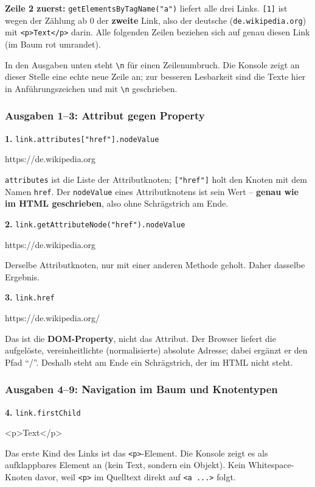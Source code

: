 \documentclass[a4paper,11pt]{article}
\begin{document}
\textbf{Zeile 2 zuerst:} \lstinline|getElementsByTagName("a")| liefert alle drei Links. \lstinline|[1]| ist wegen der
Zählung ab 0 der \textbf{zweite} Link, also der deutsche (\texttt{de.wikipedia.org}) mit \texttt{<p>Text</p>}
darin. Alle folgenden Zeilen beziehen sich auf genau diesen Link (im Baum rot umrandet).

In den Ausgaben unten steht \texttt{\textbackslash n} für einen Zeilenumbruch. Die Konsole zeigt an dieser Stelle
eine echte neue Zeile an; zur besseren Lesbarkeit sind die Texte hier in Anführungszeichen und mit
\texttt{\textbackslash n} geschrieben.

\subsubsection*{Ausgaben 1--3: Attribut gegen Property}

\textbf{1.} \lstinline|link.attributes["href"].nodeValue|
\begin{ausgabe}
https://de.wikipedia.org
\end{ausgabe}
\lstinline|attributes| ist die Liste der Attributknoten; \lstinline|["href"]| holt den Knoten mit dem Namen
\texttt{href}. Der \texttt{nodeValue} eines Attributknotens ist sein Wert -- \textbf{genau wie im HTML geschrieben},
also ohne Schrägstrich am Ende.

\textbf{2.} \lstinline|link.getAttributeNode("href").nodeValue|
\begin{ausgabe}
https://de.wikipedia.org
\end{ausgabe}
Derselbe Attributknoten, nur mit einer anderen Methode geholt. Daher dasselbe Ergebnis.

\textbf{3.} \lstinline|link.href|
\begin{ausgabe}
https://de.wikipedia.org/
\end{ausgabe}
Das ist die \textbf{DOM-Property}, nicht das Attribut. Der Browser liefert die aufgelöste, vereinheitlichte (normalisierte)
absolute Adresse; dabei ergänzt er den Pfad "`/"'. Deshalb steht am Ende ein Schrägstrich, der im HTML nicht steht.

\subsubsection*{Ausgaben 4--9: Navigation im Baum und Knotentypen}

\textbf{4.} \lstinline|link.firstChild|
\begin{ausgabe}
<p>Text</p>
\end{ausgabe}
Das erste Kind des Links ist das \texttt{<p>}-Element. Die Konsole zeigt es als aufklappbares Element an (kein Text,
sondern ein Objekt). Kein Whitespace-Knoten davor, weil \texttt{<p>} im Quelltext direkt auf \texttt{<a ...>} folgt.
\end{document}
